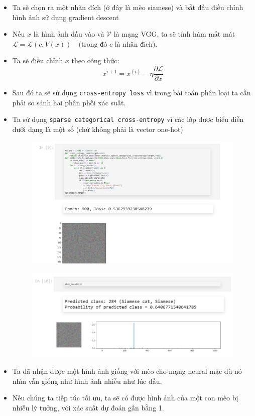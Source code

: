 \documentclass{book}
\begin{document}
\begin{itemize}
\begin{figure}[H]
	\end{figure}
	\item Ta sẽ chọn ra một nhãn đích (ở đây là mèo siamese) và bắt đầu điều chỉnh hình ảnh sử dụng gradient descent
	\item Nếu $x$ là hình ảnh đầu vào và $\mathcal{V}$ là mạng VGG, ta sẽ tính hàm mất mát $\mathcal{L} = \mathcal{L}(c, V(x)) \quad \text{(trong đó } c \text{ là nhãn đích).}$
	\item Ta sẽ điều chỉnh $x$ theo công thức:
	$$x^{i+1} = x^{(i)} - \eta \frac{\partial \mathcal{L}}{\partial x}$$
	\item Sau đó ta sẽ sử dụng \texttt{cross-entropy loss} vì trong bài toán phân loại ta cần phải so sánh hai phân phối xác suất.
	\item Ta sử dụng \texttt{sparse categorical cross-entropy} vì các lớp được biểu diễn dưới dạng là một số (chứ không phải là vector one-hot)
	\begin{figure}[H]
		\centering
		\includegraphics[width=0.75\linewidth]{images/ad4_cel.png}
	\end{figure}
	\begin{figure}[H]
		\centering
		\includegraphics[width=0.75\linewidth]{images/ad5_predict.png}
	\end{figure}
	\item Ta đã nhận được một hình ảnh giống với mèo cho mạng neural mặc dù nó nhìn vẫn giống như hình ảnh nhiễu như lúc đầu.
	\item Nếu chúng ta tiếp túc tối ưu, ta sẽ có được hình ảnh của một con mèo bị nhiễu lý tưởng, với xác suất dự đoán gần bằng 1.
\end{itemize}
\end{document}
